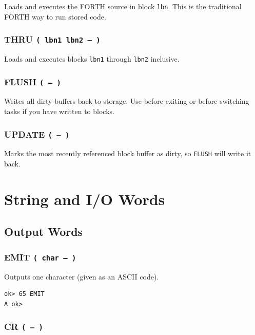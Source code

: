 Loads and executes the FORTH source in block \texttt{lbn}. This is the
traditional FORTH way to run stored code.

\subsection*{THRU \texttt{( lbn1 lbn2 -- )}}

Loads and executes blocks \texttt{lbn1} through \texttt{lbn2} inclusive.

\subsection*{FLUSH \texttt{( -- )}}

Writes all dirty buffers back to storage. Use before exiting or before
switching tasks if you have written to blocks.

\subsection*{UPDATE \texttt{( -- )}}

Marks the most recently referenced block buffer as dirty, so \texttt{FLUSH}
will write it back.

\chapter{String and I/O Words}
\label{chap:strings-io}

\section{Output Words}
\label{sec:output}

\subsection*{EMIT \texttt{( char -- )}}

Outputs one character (given as an ASCII code).

\begin{lstlisting}[language=Forth]
ok> 65 EMIT
A ok>
\end{lstlisting}

\subsection*{CR \texttt{( -- )}}

